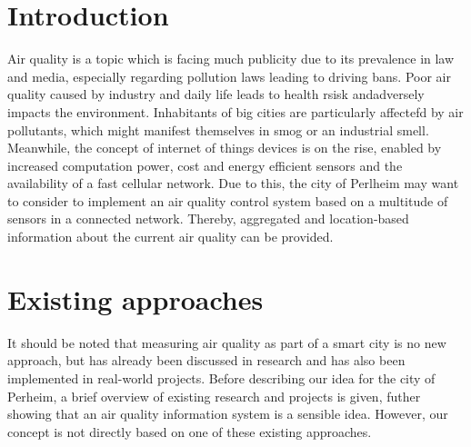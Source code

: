 \documentclass[conference]{IEEEtran}
\begin{document}
\begin{abstract}
\end{abstract}





%
\IEEEpeerreviewmaketitle

\section{Introduction}

Air quality is a topic which is facing much publicity due to its prevalence in law and media, especially regarding pollution laws leading to driving bans. Poor air quality caused by industry and daily life leads to health rsisk andadversely impacts the environment. Inhabitants of big cities are particularly affectefd by air pollutants, which might manifest themselves in smog or an industrial smell.
Meanwhile, the concept of internet of things devices is on the rise, enabled by increased computation power, cost and energy efficient sensors and the availability of a fast cellular network.
\newline
Due to this, the city of Perlheim may want to consider to implement an air quality control system based on a multitude of sensors in a connected network. Thereby, aggregated and location-based information about the current air quality can be provided.

\section{Existing approaches}
It should be noted that measuring air quality as part of a smart city is no new approach, but has already been discussed in research \cite{Nagaraj} and has also been implemented in real-world projects. Before describing our idea for the city of Perheim, a brief overview of existing research and projects is given, futher showing that an air quality information system is a sensible idea. However, our concept is not directly based on one of these existing approaches.
\end{document}

